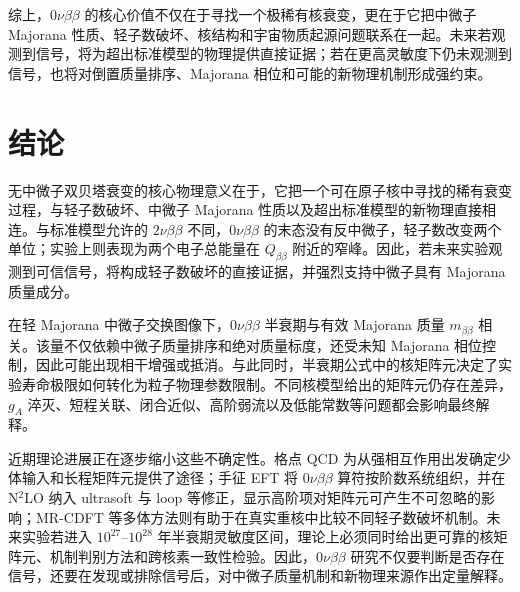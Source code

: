 \documentclass[12pt,a4paper]{ctexart}
\begin{document}
综上，$0\nu\beta\beta$ 的核心价值不仅在于寻找一个极稀有核衰变，更在于它把中微子 Majorana 性质、轻子数破坏、核结构和宇宙物质起源问题联系在一起。未来若观测到信号，将为超出标准模型的物理提供直接证据；若在更高灵敏度下仍未观测到信号，也将对倒置质量排序、Majorana 相位和可能的新物理机制形成强约束。

\section{结论}

无中微子双贝塔衰变的核心物理意义在于，它把一个可在原子核中寻找的稀有衰变过程，与轻子数破坏、中微子 Majorana 性质以及超出标准模型的新物理直接相连。与标准模型允许的 $2\nu\beta\beta$ 不同，$0\nu\beta\beta$ 的末态没有反中微子，轻子数改变两个单位；实验上则表现为两个电子总能量在 $Q_{\beta\beta}$ 附近的窄峰。因此，若未来实验观测到可信信号，将构成轻子数破坏的直接证据，并强烈支持中微子具有 Majorana 质量成分。

在轻 Majorana 中微子交换图像下，$0\nu\beta\beta$ 半衰期与有效 Majorana 质量 $m_{\beta\beta}$ 相关。该量不仅依赖中微子质量排序和绝对质量标度，还受未知 Majorana 相位控制，因此可能出现相干增强或抵消。与此同时，半衰期公式中的核矩阵元决定了实验寿命极限如何转化为粒子物理参数限制。不同核模型给出的矩阵元仍存在差异，$g_A$ 淬灭、短程关联、闭合近似、高阶弱流以及低能常数等问题都会影响最终解释。

近期理论进展正在逐步缩小这些不确定性。格点 QCD 为从强相互作用出发确定少体输入和长程矩阵元提供了途径；手征 EFT 将 $0\nu\beta\beta$ 算符按阶数系统组织，并在 N$^2$LO 纳入 ultrasoft 与 loop 等修正，显示高阶项对矩阵元可产生不可忽略的影响；MR-CDFT 等多体方法则有助于在真实重核中比较不同轻子数破坏机制。未来实验若进入 $10^{27}$--$10^{28}$ 年半衰期灵敏度区间，理论上必须同时给出更可靠的核矩阵元、机制判别方法和跨核素一致性检验。因此，$0\nu\beta\beta$ 研究不仅要判断是否存在信号，还要在发现或排除信号后，对中微子质量机制和新物理来源作出定量解释。



\end{document}
